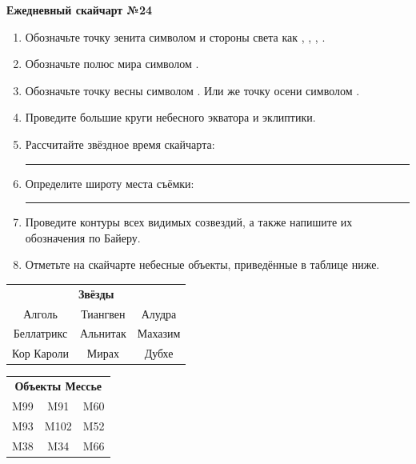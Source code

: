 \documentclass{./SAS-class-skygen}
\begin{document}
    
    
    
	\begin{center}
		\large\textbf{Ежедневный скайчарт №24}
	\end{center}

	\begin{enumerate}
		\item Обозначьте точку зенита символом  и стороны света как , , , .
		\item Обозначьте полюс мира символом .
		\item Обозначьте точку весны символом \Aries. Или же точку осени символом \Libra.
		\item Проведите большие круги небесного экватора и эклиптики.
		\item Рассчитайте звёздное время скайчарта: \rule{2cm}{0.4pt}
		\item Определите широту места съёмки: \rule{2cm}{0.4pt}
		\item Проведите контуры всех видимых созвездий, а также напишите их обозначения по Байеру.
		\item Отметьте на скайчарте небесные объекты, приведённые в таблице ниже.
	\end{enumerate}
	
    \vspace{0.5cm}

    \begin{table}[h!]
    \centering
    \begin{tabular}{ccc}
    \multicolumn{3}{c}{\textbf{Звёзды}} \\ Алголь & Тиангвен & Алудра \\
Беллатрикс & Альнитак & Махазим \\
Кор Кароли & Мирах & Дубхе \\

\end{tabular}
    \hfill
    \begin{tabular}{ccc}
    \multicolumn{3}{c}{\textbf{Объекты Мессье}} \\ M99 & M91 & M60 \\
M93 & M102 & M52 \\
M38 & M34 & M66 \\

\end{tabular}
    \end{table}
	
\end{document}
